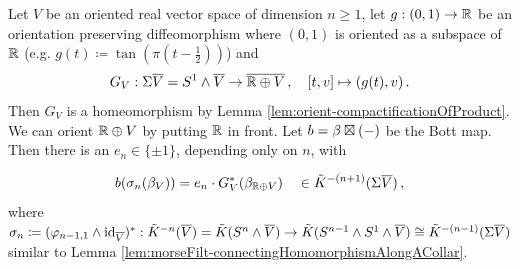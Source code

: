 \begin{lemma}\label{lem:morseFiltr-bottMapOnOrientedSuspension}
	Let $V$ be an oriented real vector space of dimension $n\geq 1$, let $g:(0,1)\to \mathbb{R}$ be an orientation preserving diffeomorphism where $(0,1)$ is oriented as a subspace of $\mathbb{R}$ (e.g. $g(t)\coloneq \tan(\pi(t-\frac{1}{2}))$) and 
	\begin{equation*}
		G_V:\Sigma \overline{V}=S^1\wedge \overline{V}\to \overline{\mathbb{R}\oplus V}\,,
		\quad [t,v]\mapsto (g(t),v)\,.
	\end{equation*} Then $G_V$ is a homeomorphism by Lemma \ref{lem:orient-compactificationOfProduct}. We can orient $\mathbb{R}\oplus V$ by putting $\mathbb{R}$ in front. Let $b=\beta \boxtimes (-)$ be the Bott map. Then there is an $e_n\in \{\pm 1\}$, depending only on $n$, with 

	\begin{equation*}
		b(\sigma_n(\beta_V))=e_n\cdot G_V^*(\beta_{\mathbb{R}\oplus V})\quad \in \tilde{K}^{-(n+1)}(\Sigma \overline{V})\,,
	\end{equation*}
	 where 
	 $\sigma_n\coloneq (\varphi_{n-1,1} \wedge \operatorname{\mathrm{id}}_{\overline{V}})^*:\tilde{K}^{-n}(\overline{V})= \tilde{K}(S^n\wedge
	  \overline{V})\to \tilde{K}(S^{n-1}\wedge S^1\wedge \overline{V}) \cong \tilde{K}^{-(n-1)}(\Sigma \overline{V})$ 
	 similar to Lemma \ref{lem:morseFilt-connectingHomomorphismAlongACollar}.
\end{lemma}
